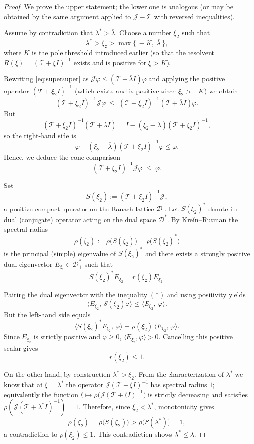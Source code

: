 \documentclass[a4paper,11pt]{amsart}
\theoremstyle{definition}
\numberwithin{equation}{section}
\theoremstyle{definition}
\begin{document}
\begin{proof}
We prove the upper statement; the lower one is analogous (or may be obtained by the same argument applied to \(\mathscr J-\mathscr T\) with reversed inequalities).

Assume by contradiction that \(\lambda^\ast>\overline\lambda\). Choose a number \(\xi_2\) such that
\[
\lambda^\ast > \xi_2 > \max\{\, -K,\; \overline\lambda \,\},
\]
where \(K\) is the pole threshold introduced earlier (so that the resolvent \(R(\xi)=(\mathscr T+\xi I)^{-1}\) exists and is positive for \(\xi> K\)).

Rewriting \eqref{eq:supersuper} as \(\mathscr J\varphi \leq (\mathscr T+\overline\lambda I)\varphi\) and applying the positive operator \((\mathscr T+\xi_2 I)^{-1}\) (which exists and is positive since \(\xi_2>-K\)) we obtain
\[
(\mathscr T+\xi_2 I)^{-1}\mathscr J \varphi \;\leq\; (\mathscr T+\xi_2 I)^{-1}(\mathscr T+\overline\lambda I)\varphi.
\]
But
\[
(\mathscr T+\xi_2 I)^{-1}(\mathscr T+\overline\lambda I)
= I - (\xi_2-\overline\lambda)(\mathscr T+\xi_2 I)^{-1},
\]
so the right-hand side is
\[
\varphi - (\xi_2-\overline\lambda)(\mathscr T+\xi_2 I)^{-1}\varphi
\leq \varphi.
\]
Hence, we deduce the cone-comparison
\[
(\mathscr T+\xi_2 I)^{-1}\mathscr J \varphi \;\leq\; \varphi.
\tag{*}
\]

Set
\[
S(\xi_2) := (\mathscr T+\xi_2 I)^{-1}\mathscr J,
\]
a positive compact operator on the Banach lattice \(\mathcal D\) . Let \(S(\xi_2)^*\) denote its dual (conjugate) operator acting on the dual space \(\mathcal D^*\). By Kreĭn--Rutman the spectral radius
\[
\rho(\xi_2):=\rho\big(S(\xi_2)\big)=\rho\big(S(\xi_2)^*\big)
\]
is the principal (simple) eigenvalue of \(S(\xi_2)^*\) and there exists a strongly positive dual eigenvector \(E_{\xi_2}\in\mathcal D^*_+\) such that
\[
S(\xi_2)^* E_{\xi_2} = r(\xi_2) E_{\xi_2}.
\]

Pairing the dual eigenvector with the inequality \((*)\) and using positivity yields
\[
\langle E_{\xi_2},\, S(\xi_2)\varphi \rangle \leq \langle E_{\xi_2},\,\varphi \rangle.
\]
But the left-hand side equals
\[
\langle S(\xi_2)^* E_{\xi_2},\,\varphi\rangle
= \rho(\xi_2)\,\langle E_{\xi_2},\,\varphi\rangle.
\]
Since \(E_{\xi_2}\) is strictly positive and \(\varphi\ge0\), \(\langle E_{\xi_2},\varphi\rangle>0\). Cancelling this positive scalar gives
\[
r(\xi_2) \leq 1.
\]

On the other hand, by construction \(\lambda^\ast>\xi_2\). From the characterization of \(\lambda^\ast\) we know that at \(\xi=\lambda^\ast\) the operator \(\mathscr J(\mathscr T+\xi I)^{-1}\) has spectral radius \(1\); equivalently the function \(\xi\mapsto \rho\big(\mathscr J(\mathscr T+\xi I)^{-1}\big)\) is strictly decreasing and satisfies \(\rho(\mathscr J(\mathscr T+\lambda^\ast I)^{-1})=1\). Therefore, since \(\xi_2<\lambda^\ast\), monotonicity gives
\[
\rho(\xi_2) = \rho\big(S(\xi_2)\big) > \rho\big(S(\lambda^\ast)\big) = 1,
\]
a contradiction to \(\rho(\xi_2)\leq1\). This contradiction shows \(\lambda^\ast\le\overline\lambda\).


\end{proof}
\end{document}
